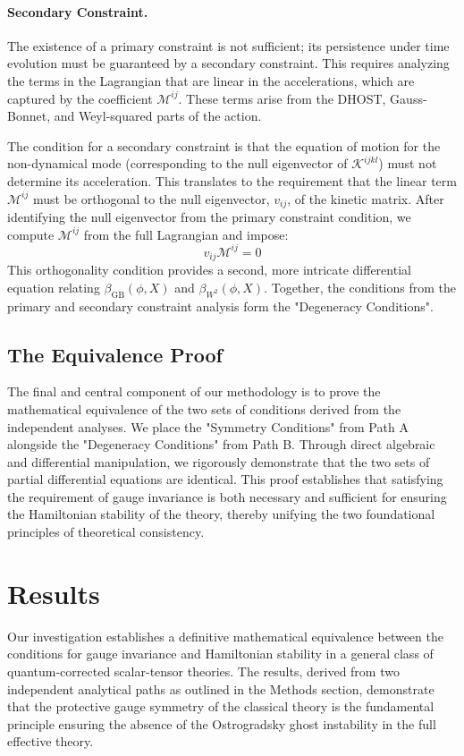 \documentclass[twocolumn]{aastex631}
\begin{document}
\paragraph{Secondary Constraint.} The existence of a primary constraint is not sufficient; its persistence under time evolution must be guaranteed by a secondary constraint. This requires analyzing the terms in the Lagrangian that are linear in the accelerations, which are captured by the coefficient $\mathcal{M}^{ij}$. These terms arise from the DHOST, Gauss-Bonnet, and Weyl-squared parts of the action.

The condition for a secondary constraint is that the equation of motion for the non-dynamical mode (corresponding to the null eigenvector of $\mathcal{K}^{ijkl}$) must not determine its acceleration. This translates to the requirement that the linear term $\mathcal{M}^{ij}$ must be orthogonal to the null eigenvector, $v_{ij}$, of the kinetic matrix. After identifying the null eigenvector from the primary constraint condition, we compute $\mathcal{M}^{ij}$ from the full Lagrangian and impose:
\begin{equation}
v_{ij}\mathcal{M}^{ij} = 0
\end{equation}
This orthogonality condition provides a second, more intricate differential equation relating $\beta_{\text{GB}}(\phi, X)$ and $\beta_{W^2}(\phi, X)$. Together, the conditions from the primary and secondary constraint analysis form the "Degeneracy Conditions".

\subsection{The Equivalence Proof}
The final and central component of our methodology is to prove the mathematical equivalence of the two sets of conditions derived from the independent analyses. We place the "Symmetry Conditions" from Path A alongside the "Degeneracy Conditions" from Path B. Through direct algebraic and differential manipulation, we rigorously demonstrate that the two sets of partial differential equations are identical. This proof establishes that satisfying the requirement of gauge invariance is both necessary and sufficient for ensuring the Hamiltonian stability of the theory, thereby unifying the two foundational principles of theoretical consistency.

\section{Results}
\label{sec:results}
Our investigation establishes a definitive mathematical equivalence between the conditions for gauge invariance and Hamiltonian stability in a general class of quantum-corrected scalar-tensor theories. The results, derived from two independent analytical paths as outlined in the Methods section, demonstrate that the protective gauge symmetry of the classical theory is the fundamental principle ensuring the absence of the Ostrogradsky ghost instability in the full effective theory.
\end{document}
